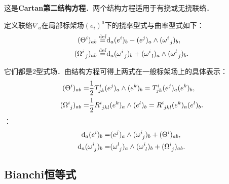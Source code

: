 这是{\heiti \bfseries Cartan第二结构方程}．两个结构方程适用于有挠或无挠联络．
\begin{definition}\label{chccr:def_TCF}
    定义联络$\nabla_a$在局部标架场$(e_i)^a$下的{\heiti 挠率型式}与{\heiti 曲率型式}如下：
    \begin{align}
        (\Theta ^{i})_{ab} \overset{\mathrm {def}}{=} & {\rm d}_a (e^i)_b -
        (e^j)_a \wedge (\omega _{\hphantom{a} j}^i)_b , \label{chccr:eqn_Tform}\\
        (\Omega_{\hphantom{a} j} ^{i})_{ab} \overset{\mathrm {def}}{=} & {\rm d}_a
        ( \omega _{\hphantom{a} j} ^i  )_b  + ( \omega _{\hphantom{a} l}^i )_a
        \wedge ( \omega _{\hphantom{a} j}^l )_b . \label{chccr:eqn_Cform}
    \end{align}
\end{definition}
它们都是2型式场．由结构方程可得上两式在一般标架场上的具体表示：
\begin{align}
    (\Theta ^{i})_{ab} = &\frac{1}{2}T_{jk}^i (e^j)_a \wedge(e^k)_b
    = T_{jk}^i (e^j)_a (e^k)_b, \label{chccr:eqn_Tform-bak}\\
    (\Omega_{\hphantom{i} j} ^{i})_{ab} = &\frac{1}{2}R_{\hphantom{i} jkl}^i
    (e^k)_a \wedge (e^l)_b = R_{\hphantom{i} jkl}^i (e^k)_a (e^l)_b . \label{chccr:eqn_Cform-bak}
\end{align}
：
\begin{subequations}\label{chccr:eqn_CST}
\begin{align}
    {\rm d}_a (e^i)_b =&(e^j)_a \wedge (\omega _{\hphantom{i} j}^i)_b +(\Theta ^{i})_{ab}, \label{chccr:eqn_CST-I} \\
    {\rm d}_a ( \omega _{\hphantom{i} j} ^i  )_b  =&  ( \omega _{\hphantom{i} j}^l )_a
    \wedge ( \omega _{\hphantom{i} l}^i )_b + (\Omega_{\hphantom{i} j} ^{i})_{ab} . \label{chccr:eqn_CST-II}
\end{align}
\end{subequations}


\subsection{Bianchi恒等式}

